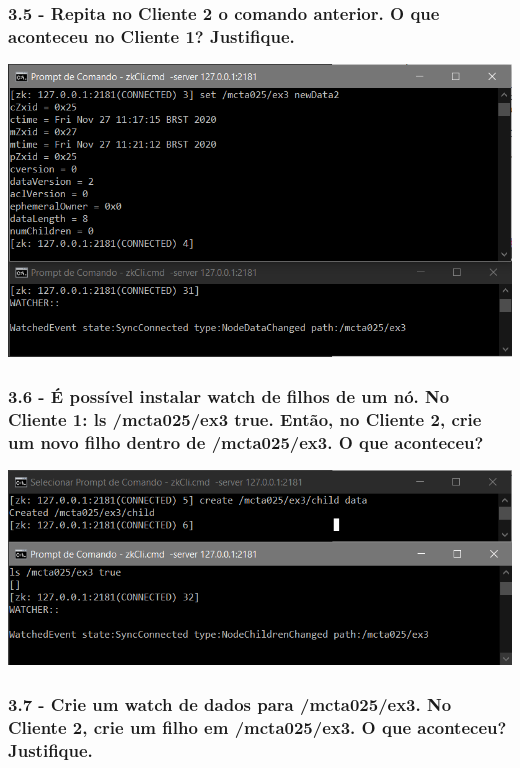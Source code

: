 \subsubsection{3.5 - Repita no Cliente 2 o comando anterior. O que aconteceu no Cliente 1? Justifique.}

\includegraphics{pratica3/prints/roteiro 3.5.PNG}

\subsubsection{3.6 - É possível instalar watch de filhos de um nó. No Cliente 1: ls
/mcta025/ex3 true. Então, no Cliente 2, crie um novo filho dentro de /mcta025/ex3. O que aconteceu?}

\includegraphics{pratica3/prints/roteiro 3.6.PNG}

\subsubsection{3.7 - Crie um watch de dados para /mcta025/ex3. No Cliente 2, crie um
filho em /mcta025/ex3. O que aconteceu? Justifique.}

